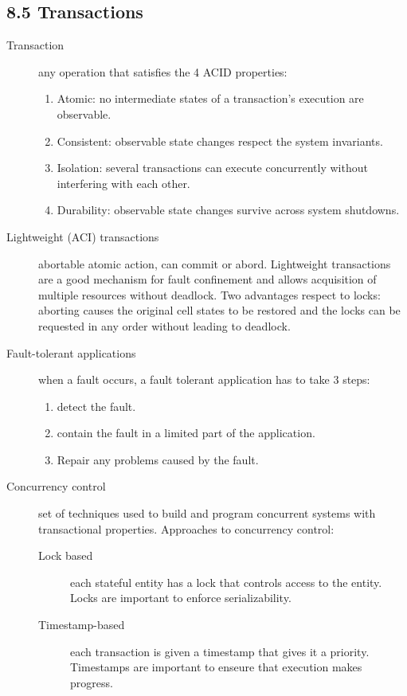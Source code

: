 \subsection{8.5 Transactions}

\begin{description}
  \item[Transaction] any operation that satisfies the 4 ACID properties:
    \begin{enumerate}
      \item Atomic: no intermediate states of a transaction's execution are observable.
      \item Consistent: observable state changes respect the system invariants.
      \item Isolation: several transactions can execute concurrently without interfering with each other.
      \item Durability: observable state changes survive across system shutdowns.
    \end{enumerate}
  \item[Lightweight (ACI) transactions] abortable atomic action, can commit or abord.
    Lightweight transactions are a good mechanism for fault confinement and allows acquisition of multiple resources without deadlock.
    Two advantages respect to locks: aborting causes the original cell states to be restored and the locks can be requested in any order without leading to deadlock.
  \item[Fault-tolerant applications] when a fault occurs, a fault tolerant application has to take 3 steps:
    \begin{enumerate}
      \item detect the fault.
      \item contain the fault in a limited part of the application.
      \item Repair any problems caused by the fault.
    \end{enumerate}

  \item[Concurrency control] set of techniques used to build and program concurrent systems with transactional properties.
    Approaches to concurrency control:
    \begin{description}
      \item[Lock based] each stateful entity has a lock that controls access to the entity.
        Locks are important to enforce serializability.
      \item[Timestamp-based] each transaction is given a timestamp that gives it a priority.
        Timestamps are important to enseure that execution makes progress.
    \end{description}


\end{description}
